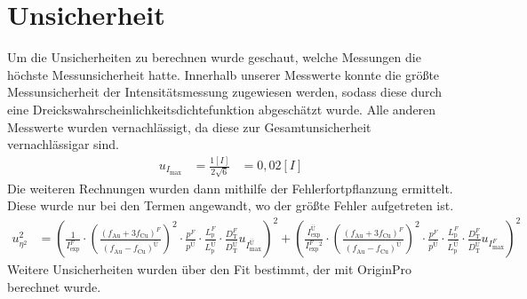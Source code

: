 \section{Unsicherheit}
Um die Unsicherheiten zu berechnen wurde geschaut, welche Messungen die höchste Messunsicherheit hatte. Innerhalb unserer Messwerte konnte die größte Messunsicherheit der Intensitätsmessung zugewiesen werden, sodass diese durch eine Dreickswahrscheinlichkeitsdichtefunktion abgeschätzt wurde. Alle anderen Messwerte wurden vernachlässigt, da diese zur Gesamtunsicherheit vernachlässigar sind.
\begin{align*}
    u_{I_\text{max}} &= \frac{1[I]}{2\sqrt{6}} &= 0,02[I]
\end{align*}
Die weiteren Rechnungen wurden dann mithilfe der Fehlerfortpflanzung ermittelt. Diese wurde nur bei den Termen angewandt, wo der größte Fehler aufgetreten ist.
\begin{align*}
    u_{\eta^2}^2 &= ({\frac{1}{I_\text{exp}^{F}}}
    \cdot 
    ({\frac{(f_\text{Au}+3f_\text{Cu})^{F}}{(f_\text{Au}-f_\text{Cu})^{Ü}}})^{2}
    \cdot
    {\frac{p^{F}}{p^{Ü}}}
    \cdot
    {\frac{L_\text{p}^{F}}{L_\text{p}^{Ü}}}
    \cdot
    {\frac{D_\text{T}^{F}}{D_\text{T}^{Ü}}}u_{I_\text{max}^{Ü}})^2 + 
    ({\frac{I_\text{exp}^{Ü}}{I_\text{exp}^{F}^2}}
    \cdot 
    ({\frac{(f_\text{Au}+3f_\text{Cu})^{F}}{(f_\text{Au}-f_\text{Cu})^{Ü}}})^{2}
    \cdot
    {\frac{p^{F}}{p^{Ü}}}
    \cdot
    {\frac{L_\text{p}^{F}}{L_\text{p}^{Ü}}}
    \cdot
    {\frac{D_\text{T}^{F}}{D_\text{T}^{Ü}}}u_{I_\text{max}^{F}})^2
\end{align*}
Weitere Unsicherheiten wurden über den Fit bestimmt, der mit OriginPro berechnet wurde.


